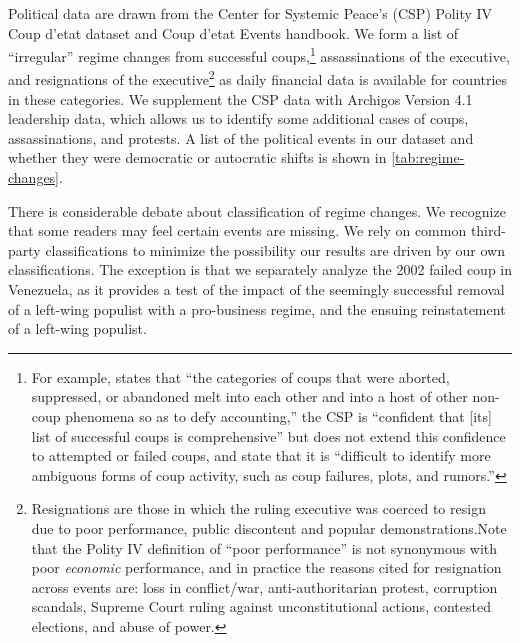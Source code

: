 \documentclass[12pt,final,fleqn]{article}
\theoremstyle{plain}
\begin{document}
Political data are drawn from the Center for Systemic Peace's (CSP) Polity IV Coup d'etat dataset and Coup d'etat Events handbook. We form a list of ``irregular'' regime changes from successful coups,\footnote{For example, \citet[p. 617]{needler1966political} states that ``the categories of coups that were aborted, suppressed, or abandoned melt into each other and into a host of other non-coup phenomena so as to defy accounting,'' the CSP is ``confident that [its] list of successful coups is comprehensive'' but does not extend this confidence to attempted or failed coups, and \citet{powell2011global} state that it is ``difficult to identify more ambiguous forms of coup activity, such as coup failures, plots, and rumors.''} assassinations of the executive, and resignations of the executive\footnote{Resignations are those in which the ruling executive was coerced to resign due to poor performance, public discontent and popular demonstrations.Note that the Polity IV definition of ``poor performance'' is not synonymous with poor \textit{economic} performance, and in practice the reasons cited for resignation across events are: loss in conflict/war, anti-authoritarian protest, corruption scandals, Supreme Court ruling against unconstitutional actions, contested elections, and abuse of power.} as daily financial data is available for countries in these categories. We supplement the CSP data with Archigos Version 4.1 leadership data, which allows us to identify some additional cases of coups, assassinations, and protests. A list of the political events in our dataset and whether they were democratic or autocratic shifts is shown in \autoref{tab:regime-changes}. 


There is considerable debate about classification of regime changes. We recognize that some readers may feel certain events are missing. We rely on common third-party classifications to minimize the possibility our results are driven by our own classifications. The exception is that we separately analyze the 2002 failed coup  in Venezuela, as it provides a test of the impact of the seemingly successful removal of a left-wing populist with a pro-business regime, and the ensuing reinstatement of a left-wing populist. 
\end{document}
